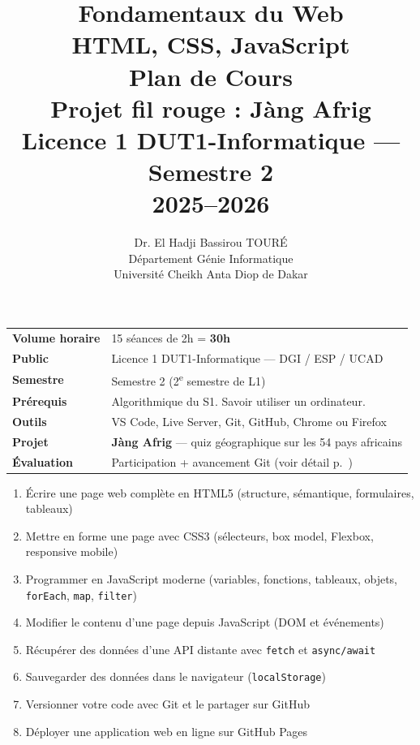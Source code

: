 \documentclass[11pt,a4paper]{article}
\title{%
\vspace{-1cm}
\textbf{\LARGE Fondamentaux du Web}\\
\textbf{\LARGE HTML, CSS, JavaScript}\\[0.8cm]
\textbf{\huge Plan de Cours}\\[0.3cm]
\textbf{\Large Projet fil rouge : Jàng Afrig}\\[0.5cm]
\large Licence 1 DUT1-Informatique --- Semestre 2\\
2025--2026}
\author{Dr. El Hadji Bassirou TOURÉ\\
Département Génie Informatique\\
Université Cheikh Anta Diop de Dakar}
\date{}
\begin{document}
\maketitle
\thispagestyle{empty}

\vspace{0.5cm}

\begin{prereqbox}
\begin{center}
\begin{tabular}{ll}
\toprule
\textbf{Volume horaire} & 15 séances de 2h = \textbf{30h} \\
\textbf{Public} & Licence 1 DUT1-Informatique --- DGI / ESP / UCAD \\
\textbf{Semestre} & Semestre 2 (2\textsuperscript{e} semestre de L1) \\
\textbf{Prérequis} & Algorithmique du S1. Savoir utiliser un ordinateur. \\
\textbf{Outils} & VS Code, Live Server, Git, GitHub, Chrome ou Firefox \\
\textbf{Projet} & \textbf{Jàng Afrig} --- quiz géographique sur les 54 pays africains \\
\textbf{Évaluation} & Participation + avancement Git (voir détail p.~\pageref{sec:evaluation}) \\
\bottomrule
\end{tabular}
\end{center}
\end{prereqbox}

\begin{objectifbox}
\begin{enumerate}[nosep]
    \item Écrire une page web complète en HTML5 (structure, sémantique, formulaires, tableaux)
    \item Mettre en forme une page avec CSS3 (sélecteurs, box model, Flexbox, responsive mobile)
    \item Programmer en JavaScript moderne (variables, fonctions, tableaux, objets, \texttt{forEach}, \texttt{map}, \texttt{filter})
    \item Modifier le contenu d'une page depuis JavaScript (DOM et événements)
    \item Récupérer des données d'une API distante avec \texttt{fetch} et \texttt{async/await}
    \item Sauvegarder des données dans le navigateur (\texttt{localStorage})
    \item Versionner votre code avec Git et le partager sur GitHub
    \item Déployer une application web en ligne sur GitHub Pages
\end{enumerate}
\end{objectifbox}
\end{document}
